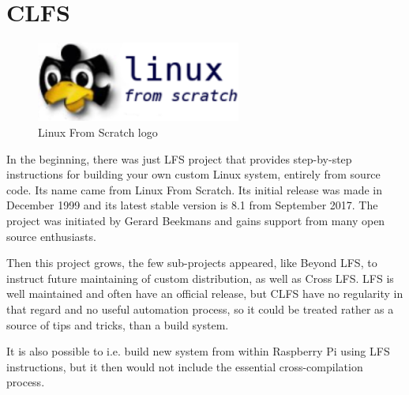\documentclass[printmode]{mgr}
\begin{document}


\section{CLFS}

\begin{figure}[htbp]
  \centering
    \includegraphics[width=0.6\textwidth]{lfs-logo.png}
    \caption{Linux From Scratch logo}
  \label{fig:lfs-logo}
\end{figure}


In the beginning, there was just LFS project that provides step-by-step instructions for building your own custom Linux system, entirely from source code.
Its name came from Linux From Scratch.
Its initial release was made in December 1999 and its latest stable version is 8.1 from September 2017. The project was initiated by Gerard Beekmans and gains support from many open source enthusiasts.

Then this project grows, the few sub-projects appeared, like Beyond LFS, to instruct future maintaining of custom distribution, as well as Cross LFS.
LFS is well maintained and often have an official release, but CLFS have no regularity in that regard and no useful automation process, so it could be treated rather as a source of tips and tricks, than a build system.

It is also possible to i.e. build new system from within Raspberry Pi using LFS instructions, but it then would not include the essential cross-compilation process.


\end{document}
